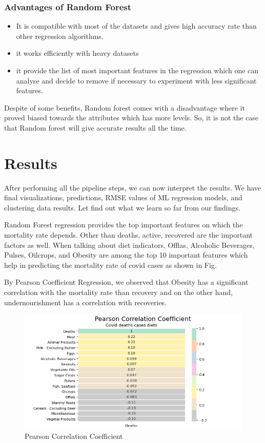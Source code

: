 \documentclass[journal,twoside,web]{ieeecolor}
\begin{document}
\subsubsection{Advantages of Random Forest}
\begin{itemize}
    \item It is compatible with most of the datasets and gives high accuracy rate than other regression algorithms.
    \item it works efficiently with heavy datasets
    \item it provide the list of most important features in the regression which one can analyse and decide to remove if necessary to experiment with less significant features.
\end{itemize}

Despite of some benefits, Random forest comes with a disadvantage where it proved biased towards the attributes which has more levels. So, it is not the case that Random forest will give accurate results all the time.

\section{Results}
After performing all the pipeline steps, we can now interpret the results. We have final visualizations, predictions, RMSE values of ML regression models, and clustering data results. Let find out what we learn so far from our findings.

Random Forest regression provides the top important features on which the mortality rate depends. Other than deaths, active, recovered are the important factors as well. When talking about diet indicators, Offlas, Alcoholic Beverages,  Pulses, Oilcrops, and Obesity are among the top 10 important features which help in predicting the mortality rate of covid cases as shown in Fig.

By Pearson Coefficient Regression, we observed that Obesity has a significant correlation with the mortality rate than recovery and on the other hand, undernourishment has a correlation with recoveries.

\begin{figure}[!t]
\centerline{\includegraphics[width=\columnwidth]{profig11.png}}
\caption{Pearson Correlation Coefficient}
\label{fig1}
\end{figure}
\end{document}
